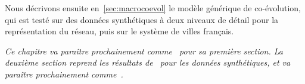 Nous décrivons ensuite en~\ref{sec:macrocoevol} le modèle générique de co-évolution, qui est testé sur des données synthétiques à deux niveaux de détail pour la représentation du réseau, puis sur le système de villes français.



\stars


\textit{Ce chapitre va paraître prochainement comme~\cite{raimbault2018unveiling} pour sa première section. La deuxième section reprend les résultats de~\cite{raimbault2017macro} pour les données synthétiques, et va paraître prochainement comme~\cite{raimbault2018models}.
}














